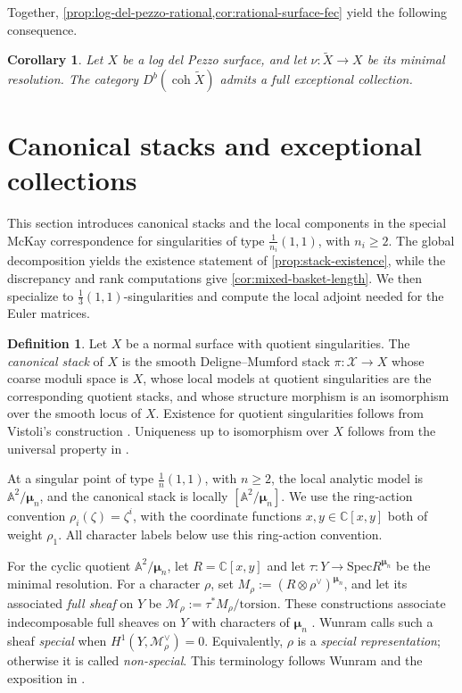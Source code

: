 \documentclass[11pt]{article}
\theoremstyle{plain}
\newtheorem{corollary}[corollary]{Corollary}
\theoremstyle{definition}
\newtheorem{definition}[definition]{Definition}
\theoremstyle{remark}
\newcommand{\A}{\mathbb A}
\newcommand{\C}{\mathbb C}
\newcommand{\Db}{D^b}
\newcommand{\coh}{\operatorname{coh}}
\newcommand{\Spec}{\mathrm{Spec}}
\newcommand{\XX}{\mathcal X}
\begin{document}
Together, \cref{prop:log-del-pezzo-rational,cor:rational-surface-fec} yield the following consequence.

\begin{corollary}\label{cor:resolution-fec}
Let \(X\) be a log del Pezzo surface, and let \(\nu:\widetilde X\to X\) be its minimal resolution. The category \(\Db(\coh \widetilde X)\) admits a full exceptional collection.
\end{corollary}

\section{Canonical stacks and exceptional collections}
\label{sec:canonical-stack}

This section introduces canonical stacks and the local components in the
special McKay correspondence for singularities of type
\(\frac1{n_i}(1,1)\), with \(n_i\geq2\). The global decomposition yields
the existence statement of \cref{prop:stack-existence}, while the
discrepancy and rank computations give \cref{cor:mixed-basket-length}.
We then specialize to \(\frac13(1,1)\)-singularities and compute the local
adjoint needed for the Euler matrices.

\begin{definition}
Let \(X\) be a normal surface with quotient singularities. The \emph{canonical stack} of \(X\) is the smooth Deligne--Mumford stack \(\pi:\XX\to X\) whose coarse moduli space is \(X\), whose local models at quotient singularities are the corresponding quotient stacks, and whose structure morphism is an isomorphism over the smooth locus of \(X\).
Existence for quotient singularities follows from Vistoli's construction
\cite[Proposition~2.8 and its proof]{Vistoli1989}. Uniqueness up to
isomorphism over \(X\) follows from the universal property in
\cite[Theorem~4.6 and Remark~4.9]{FantechiMannNironi2010}.
\end{definition}

At a singular point of type \(\frac1n(1,1)\), with \(n\geq2\), the
local analytic model is \(\A^2/\boldsymbol\mu_n\), and the canonical
stack is locally \([\A^2/\boldsymbol\mu_n]\). We use the ring-action
convention \(\rho_i(\zeta)=\zeta^i\), with the coordinate functions
\(x,y\in\C[x,y]\) both of weight \(\rho_1\).
All character labels below use this ring-action convention.

For the cyclic quotient \(\A^2/\boldsymbol\mu_n\), let \(R=\C[x,y]\)
and let \(\tau:Y\to\Spec R^{\boldsymbol\mu_n}\) be the minimal resolution.
For a character \(\rho\), set
\(M_\rho:=(R\otimes\rho^\vee)^{\boldsymbol\mu_n}\), and let its associated
\emph{full sheaf} on \(Y\) be
\(\mathcal M_\rho:=\tau^*M_\rho/\text{torsion}\).
These constructions associate indecomposable full sheaves on \(Y\) with
characters of \(\boldsymbol\mu_n\) \cite[Section~2]{Ishii2015}.
Wunram calls such a sheaf \emph{special} when
\(H^1(Y,\mathcal M_\rho^\vee)=0\).
Equivalently, \(\rho\) is a \emph{special representation}; otherwise it is
called \emph{non-special}. This terminology follows Wunram
\cite{Wunram1988} and the exposition in \cite[Section~2]{Ishii2015}.
\end{document}
